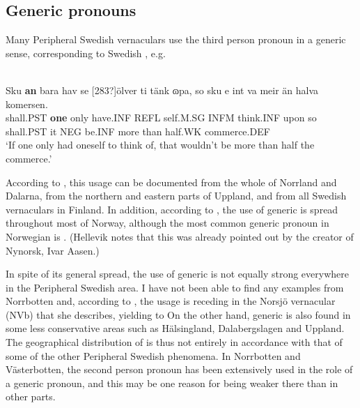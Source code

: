 
\subsection{Generic pronouns}

Many Peripheral Swedish vernaculars use the third person pronoun  in a generic sense, corresponding to Swedish , e.g.


\ea\label{}
\\
\gll Sku  \textbf{an} bara  hav  se  [283?]ölver  ti  tänk  ɷpa,  so sku  e  int  va  meir  än  halva  komersen.\\
shall.PST  \textbf{one} only  have.INF  REFL  self.M.SG  INFM  think.INF  upon  so shall.PST   it  NEG  be.INF  more  than  half.WK  commerce.DEF\\ 
\glt ‘If one only had oneself to think of, that wouldn’t be more than half the commerce.’
\z

According to \citet[84]{Westerberg2004}, this usage can be documented from the whole of Norrland and Dalarna, from the northern and eastern parts of Uppland, and from all Swedish vernaculars in Finland. In addition, according to \citet[48]{Hellevik1979}, the use of generic  is spread throughout most of Norway, although the most common generic pronoun in Norwegian is . (Hellevik notes that this was already pointed out by the creator of Nynorsk, Ivar Aasen.)



In spite of its general spread, the use of generic  is not equally strong everywhere in the Peripheral Swedish area. I have not been able to find any examples from Norrbotten and, according to \citet[85]{Westerberg2004}, the usage is receding in the Norsjö vernacular (NVb) that she describes, yielding to On the other hand, generic  is also found in some less conservative areas such as Hälsingland, Dalabergslagen and Uppland. The geographical distribution of  is thus not entirely in accordance with that of some of the other Peripheral Swedish phenomena. In Norrbotten and Västerbotten, the second person pronoun  has been extensively used in the role of a generic pronoun, and this may be one reason for  being weaker there than in other parts. 




